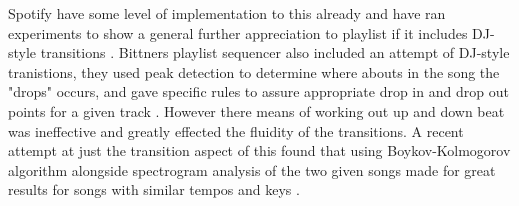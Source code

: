 Spotify have some level of implementation to this already and have ran experiments to show a general further appreciation to playlist if it includes DJ-style transitions \citep{bittner_automatic_2017}. Bittners playlist sequencer also included an attempt of DJ-style tranistions, they used peak detection to determine where abouts in the song the "drops" occurs, and gave specific rules to assure appropriate drop in and drop out points for a given track \citep{bittner_automatic_2017}.  However there means of working out up and down beat was ineffective and greatly effected the fluidity of the transitions. A recent attempt at just the transition aspect of this found that using Boykov-Kolmogorov algorithm alongside spectrogram analysis of the two given songs made for great results for songs with similar tempos and keys \citep{robinson_automated_2023}.


